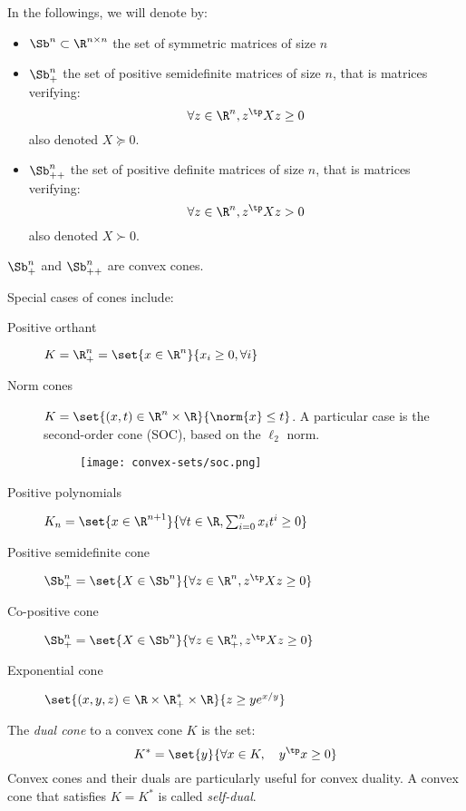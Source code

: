 In the followings, we will denote by:
\begin{itemize}
    \item $\Sb^n\subset\R^{n\times n}$ the set of symmetric matrices of size $n$
    \item $\Sb^n_+$ the set of positive semidefinite matrices of size $n$, that is matrices verifying:
    \begin{equation*}
        \forall z\in\R^n, z^\tp Xz\geq 0
    \end{equation*}
    also denoted $X\succcurlyeq 0$.
    \item $\Sb^n_{++}$ the set of positive definite matrices of size $n$, that is matrices verifying:
    \begin{equation*}
        \forall z\in\R^n, z^\tp Xz > 0
    \end{equation*}
    also denoted $X\succ 0$.
\end{itemize}
$\Sb^n_+$ and $\Sb^n_{++}$ are convex cones.

Special cases of cones include:
\begin{description}
    \item[Positive orthant] $K = \R_+^n = \set{x\in\R^n}{x_i\geq 0, \forall i}$
    \item[Norm cones] $K = \set{(x, t)\in\R^n\times\R}{\norm{x}\leq t}$. A particular case is the second-order cone (SOC), based on the $\ell_2$ norm.
    \begin{figure}[H]
        \centering
        \texttt{[image: convex-sets/soc.png]}
    \end{figure}
    \item[Positive polynomials] $K_n = \set{x\in\R^{n+1}}{\forall t\in\R, \sum_{i=0}^n x_i t^i \geq 0}$
    \item[Positive semidefinite cone] $\Sb^n_+ = \set{X\in\Sb^n}{\forall z\in\R^n, z^\tp Xz\geq0}$ 
    \item[Co-positive cone] $\Sb^n_+ = \set{X\in\Sb^n}{\forall z\in\R^n_+, z^\tp Xz\geq0}$ 
    \item[Exponential cone] $\set{(x,y,z)\in\R\times\R_+^*\times\R}{z\geq ye^{x/y}}$ 
\end{description}

\begin{definition}
    The \emph{dual cone} to a convex cone $K$ is the set:
    \begin{equation*}
        K^* = \set{y}{\forall x\in K,\quad y^\tp x\geq 0}
    \end{equation*}
    Convex cones and their duals are particularly useful for convex duality. A convex cone that satisfies $K=K^*$ is called \emph{self-dual}.
\end{definition}

